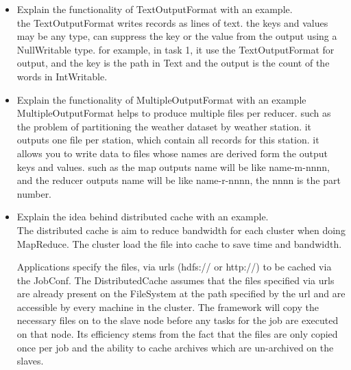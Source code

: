 \documentclass[12pt]{article}
\begin{document}
	\begin{itemize}
		\item Explain the functionality of TextOutputFormat with an example.\\
		the TextOutputFormat writes records as lines of text. the keys and values may be any type, can suppress the key or the value from the output using a NullWritable type. for example, in task 1, it use the TextOutputFormat for output, and the key is the path in Text and the output is the count of the words in IntWritable.
				
		\item Explain the functionality of MultipleOutputFormat with an example\\
		MultipleOutputFormat helps to produce multiple files per reducer. such as the problem of partitioning the weather dataset by weather station. it outputs one file per station, which contain all records for this station. it allows you to write data to files whose names are derived form the output keys and values. such as the map outputs name will be like name-m-nnnn, and the reducer outputs name will be like name-r-nnnn, the nnnn is the part number.
		\item Explain the idea behind distributed cache with an example.\\
		The distributed cache is aim to reduce bandwidth for each cluster when doing MapReduce. The cluster load the file into cache to save time and bandwidth. 
		
		Applications specify the files, via urls (hdfs:// or http://) to be cached via the JobConf. The DistributedCache assumes that the files specified via urls are already present on the FileSystem at the path specified by the url and are accessible by every machine in the cluster.
The framework will copy the necessary files on to the slave node before any tasks for the job are executed on that node. Its efficiency stems from the fact that the files are only copied once per job and the ability to cache archives which are un-archived on the slaves.
		
	
	\end{itemize}
	
\end{document}
